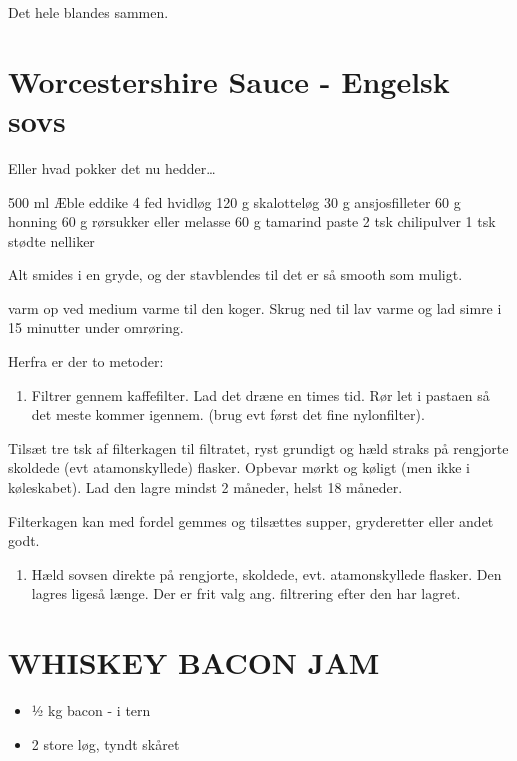 \documentclass[
]{book}
\providecommand{\tightlist}{%
  \setlength{\itemsep}{0pt}\setlength{\parskip}{0pt}}
\begin{document}
Det hele blandes sammen.

\section{Worcestershire Sauce - Engelsk sovs}\label{worcestershire-sauce---engelsk-sovs}

Eller hvad pokker det nu hedder\ldots{}

500 ml Æble eddike
4 fed hvidløg
120 g skalotteløg
30 g ansjosfilleter
60 g honning
60 g rørsukker eller melasse
60 g tamarind paste
2 tsk chilipulver
1 tsk stødte nelliker

Alt smides i en gryde, og der stavblendes til det er så smooth som muligt.

varm op ved medium varme til den koger. Skrug ned til lav varme og lad simre
i 15 minutter under omrøring.

Herfra er der to metoder:

\begin{enumerate}
\def\labelenumi{\arabic{enumi}.}
\tightlist
\item
  Filtrer gennem kaffefilter. Lad det dræne en times tid. Rør let i pastaen
  så det meste kommer igennem. (brug evt først det fine nylonfilter).
\end{enumerate}

Tilsæt tre tsk af filterkagen til filtratet, ryst grundigt og hæld straks på
rengjorte skoldede (evt atamonskyllede) flasker. Opbevar mørkt og køligt
(men ikke i køleskabet). Lad den lagre mindst 2 måneder, helst 18 måneder.

Filterkagen kan med fordel gemmes og tilsættes supper, gryderetter eller andet godt.

\begin{enumerate}
\def\labelenumi{\arabic{enumi}.}
\setcounter{enumi}{1}
\tightlist
\item
  Hæld sovsen direkte på rengjorte, skoldede, evt. atamonskyllede flasker.
  Den lagres ligeså længe. Der er frit valg ang. filtrering efter den har lagret.
\end{enumerate}

\section{WHISKEY BACON JAM}\label{whiskey-bacon-jam}

\begin{itemize}
\tightlist
\item
  ½ kg bacon - i tern
\item
  2 store løg, tyndt skåret
\end{itemize}
\end{document}
